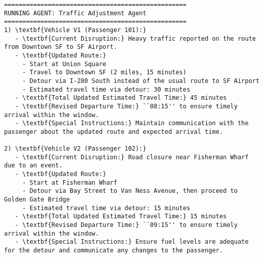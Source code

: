 \begin{lstlisting}[style=JSONStyle, caption=Sample JSON Output from Agent Pipeline, label=lst:disruptionp3p4]
==================================================
RUNNING AGENT: Traffic Adjustment Agent
==================================================
1) \textbf{Vehicle V1 (Passenger 101):}
   - \textbf{Current Disruption:} Heavy traffic reported on the route from Downtown SF to SF Airport.
   - \textbf{Updated Route:}
     - Start at Union Square
     - Travel to Downtown SF (2 miles, 15 minutes)
     - Detour via I-280 South instead of the usual route to SF Airport
     - Estimated travel time via detour: 30 minutes
   - \textbf{Total Updated Estimated Travel Time:} 45 minutes
   - \textbf{Revised Departure Time:} ``08:15'' to ensure timely arrival within the window.
   - \textbf{Special Instructions:} Maintain communication with the passenger about the updated route and expected arrival time.

2) \textbf{Vehicle V2 (Passenger 102):}
   - \textbf{Current Disruption:} Road closure near Fisherman Wharf due to an event.
   - \textbf{Updated Route:}
     - Start at Fisherman Wharf
     - Detour via Bay Street to Van Ness Avenue, then proceed to Golden Gate Bridge
     - Estimated travel time via detour: 15 minutes
   - \textbf{Total Updated Estimated Travel Time:} 15 minutes
   - \textbf{Revised Departure Time:} ``09:15'' to ensure timely arrival within the window.
   - \textbf{Special Instructions:} Ensure fuel levels are adequate for the detour and communicate any changes to the passenger.

\end{lstlisting}
